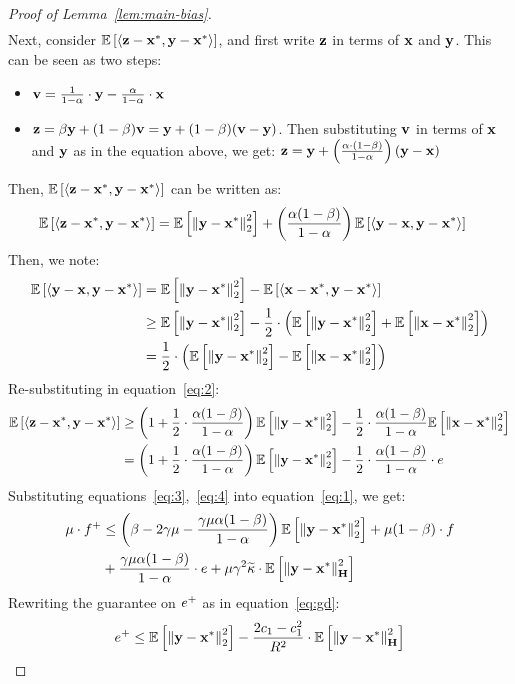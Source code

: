 \begin{proof}[Proof of Lemma~\ref{lem:main-bias}]
\begin{align}
\end{align}
Next, consider $\mathbb{E}\left[\left\langle \mathbf{z}-\mathbf{x}^*, \mathbf{y}-\mathbf{x}^* \right\rangle\right]$, and first write $\mathbf{z}$ in terms of $\mathbf{x}$ and $\mathbf{y}$. This can be seen as two steps:
\begin{itemize}
\item $\mathbf{v} = \frac{1}{1-\alpha}\cdot\mathbf{y}-\frac{\alpha}{1-\alpha}\cdot\mathbf{x}$
\item $\mathbf{z} = \beta\mathbf{y} + (1-\beta)\mathbf{v}=\mathbf{y} + (1-\beta)(\mathbf{v}-\mathbf{y})$. Then substituting $\mathbf{v}$ in terms of $\mathbf{x}$ and $\mathbf{y}$ as in the equation above, we get: $\mathbf{z} = \mathbf{y} + \left(\frac{\alpha\cdot(1-\beta)}{1-\alpha}\right)(\mathbf{y}-\mathbf{x})$
\end{itemize}
Then, $\mathbb{E}\left[\left\langle \mathbf{z}-\mathbf{x}^*, \mathbf{y}-\mathbf{x}^* \right\rangle\right]$ can be written as:
\begin{align}
\label{eq:2}
\E{\iprod{\z-\xs}{\y-\xs}}&=\E{\twonorm{\y-\xs}^2}+\left(\frac{\alpha(1-\beta)}{1-\alpha}\right)\E{\iprod{\y-\x}{\y-\xs}}
\end{align}
Then, we note:
\begin{align*}
\mathbb{E}\left[\left\langle \mathbf{y}-\mathbf{x}, \mathbf{y}-\mathbf{x}^* \right\rangle\right] &= \mathbb{E}\left[\left\| \mathbf{y}-\mathbf{x}^* \right\|_2^2\right]-\mathbb{E}\left[\left\langle \mathbf{x}-\mathbf{x}^*, \mathbf{y}-\mathbf{x}^* \right\rangle\right]\\
&\geq \mathbb{E}\left[\left\| \mathbf{y}-\mathbf{x}^* \right\|_2^2\right]-\frac{1}{2}\cdot\left(\mathbb{E}\left[\left\| \mathbf{y}-\mathbf{x}^* \right\|_2^2\right]+\mathbb{E}\left[\left\| \mathbf{x}-\mathbf{x}^* \right\|_2^2\right]\right) \\
&=\frac{1}{2}\cdot\left(\mathbb{E}\left[\left\| \mathbf{y}-\mathbf{x}^* \right\|_2^2\right]-\mathbb{E}\left[\left\| \mathbf{x}-\mathbf{x}^* \right\|_2^2\right]\right)
\end{align*}
Re-substituting in equation~\ref{eq:2}:
\begin{align}
\label{eq:4}
\E{\iprod{\z-\xs}{\y-\xs}}&\geq\left(1+\frac{1}{2}\cdot\frac{\alpha(1-\beta)}{1-\alpha}\right)\E{\twonorm{\y-\xs}^2}-\frac{1}{2}\cdot\frac{\alpha(1-\beta)}{1-\alpha}\E{\twonorm{\x-\xs}^2}\nonumber\\
&=\left(1+\frac{1}{2}\cdot\frac{\alpha(1-\beta)}{1-\alpha}\right)\E{\twonorm{\y-\xs}^2}-\frac{1}{2}\cdot\frac{\alpha(1-\beta)}{1-\alpha}\cdot \e
\end{align}
Substituting equations~\ref{eq:3},~\ref{eq:4} into equation~\ref{eq:1}, we get:
\begin{align*}
\mu\cdot f^+&\leq \left(\beta-2\gamma\mu-\frac{\gamma\mu\alpha(1-\beta)}{1-\alpha}\right)\mathbb{E}\left[\left\| \mathbf{y}-\mathbf{x}^* \right\|_2^2\right]+\mu(1-\beta)\cdot f \nonumber\\&+ \frac{\gamma\mu\alpha(1-\beta)}{1-\alpha}\cdot e+\mu\gamma^2\widetilde{\kappa}\cdot\mathbb{E}\left[\left\| \mathbf{y}-\mathbf{x}^* \right\|^2_{\mathbf{H}}\right]
\end{align*}
Rewriting the guarantee on $e^+$ as in equation~\ref{eq:gd}:
\begin{align*}
\eplus \leq \E{\twonorm{\y-\xs}^2}-\frac{2\cone-\cone^2}{\infbound}\cdot\E{\norm{\y-\xs}^2_{\H}}

\end{align*}
\end{proof}
